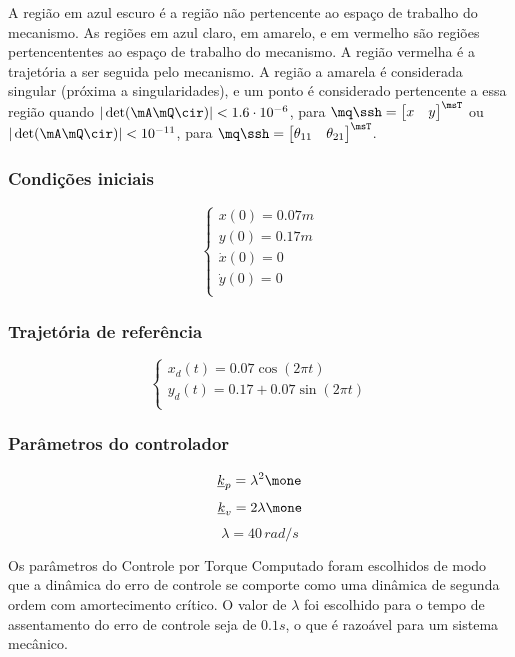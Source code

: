 \documentclass[]{politex}
\begin{document}
A região em azul escuro é a região não pertencente ao espaço de trabalho do mecanismo. As regiões em azul claro, em amarelo, e em vermelho são regiões pertencententes ao espaço de trabalho do mecanismo. A região vermelha é a trajetória a ser seguida pelo mecanismo. A região a amarela é considerada singular (próxima a singularidades), e um ponto é considerado pertencente a essa região quando $|\det(\mA\mQ\cir)| < 1.6 \cdot 10^{-6}$, para $\mq\ssh = \begin{bmatrix} x & y \end{bmatrix}^\msT$ ou $|\det(\mA\mQ\cir)| < 10^{-11}$, para $\mq\ssh = \begin{bmatrix} \theta_{11} & \theta_{21} \end{bmatrix}^\msT$.

\subsubsection{Condições iniciais}
\begin{equation}
\begin{cases}
x(0) = 0.07 m\\
y(0) = 0.17 m \\
\dot{x}(0) = 0 \\
\dot{y}(0) = 0 \\
\end{cases}
\end{equation}

\subsubsection{Trajetória de referência}
\begin{equation}
\begin{cases}
x_{d}(t) = 0.07 \cos(2 \pi t) \\
y_{d}(t) = 0.17 + 0.07 \sin(2 \pi t) \\
\end{cases}
\end{equation}

\subsubsection{Parâmetros do controlador}
$$ \underline{k}_p = \lambda^2 \mone $$
$$ \underline{k}_v = 2\lambda \mone $$
$$ \lambda = 40 \, rad/s $$

Os parâmetros do Controle por Torque Computado foram escolhidos de modo que a dinâmica do erro de controle se comporte como uma dinâmica de segunda ordem com amortecimento crítico. O valor de $\lambda$ foi escolhido para o tempo de assentamento do erro de controle seja de $0.1s$, o que é razoável para um sistema mecânico.
\end{document}
